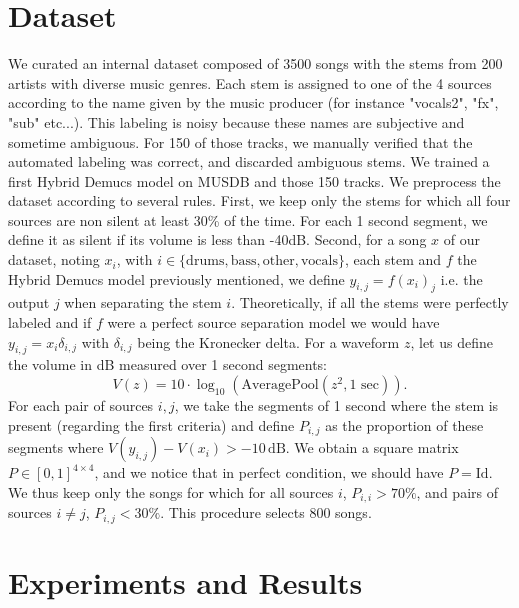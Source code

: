\documentclass{article}
\newcommand{\alex}[1]{{\color{blue} A: #1}}
\begin{document}
\section{Dataset}
\label{sec:dataset}
We curated an internal dataset composed of 3500 songs with the stems from 200 artists with diverse music genres. Each stem is assigned to one of the 4 sources according to the name given by the music producer (for instance "vocals2", "fx", "sub" etc...). This labeling is noisy because these names are subjective and sometime ambiguous. 
For 150 of those tracks, we manually verified that the automated 
labeling was correct, and discarded ambiguous stems. 
We trained a first Hybrid Demucs model on MUSDB and those 150 tracks.
We preprocess the dataset according to several rules.
First, we keep only the stems for which all four sources are non silent at least 30\% of the time. For each 1 second segment, we define it as silent if its volume is less than -40dB. 
Second, for a song $x$ of our dataset, noting $x_i$, with $i \in \{\mathrm{drums, bass, other, vocals} \}$, each stem and $f$ the Hybrid Demucs model previously mentioned, we define $y_{i,j}{=}f(x_i)_j$ i.e. the output $j$ when separating the stem $i$. Theoretically, if all the stems were perfectly labeled and if $f$ were a perfect source separation model we would have $y_{i, j} = x_i \delta_{i, j}$ with $\delta_{i, j}$ being the Kronecker delta.
For a waveform $z$, let us define the volume in dB measured over 1 second segments:
\begin{equation}
    V(z) = 10\cdot\log_{10}\left(\mathrm{AveragePool}(z^2, 1\text{ sec})\right).
\end{equation}
For each pair of sources $i,j$, we take the segments of 1 second where the stem is present (regarding the first criteria) and define $P_{i,j}$ as the proportion of these segments where $V(y_{i,j}) - V(x_i) > -10\,\mathrm{dB}$.
We obtain a square matrix $P\in [0, 1]^{4 \times 4}$, and we notice that in perfect condition, we should have $P = \mathrm{Id}$. We thus keep only the songs for which for all sources $i$, $P_{i, i} > 70\%$, and pairs
of sources $i \neq j$, $P_{i, j} < 30\%$. This procedure selects 800 songs.


\section{Experiments and Results}
\label{sec:results}
\end{document}
